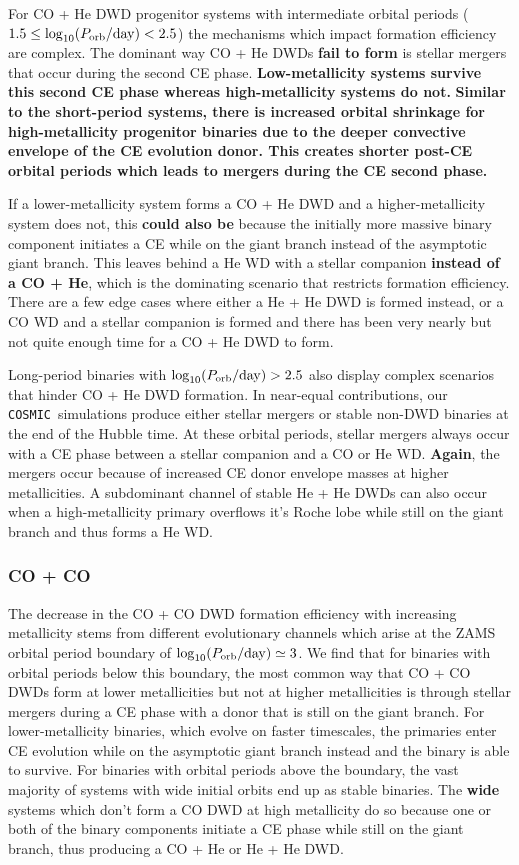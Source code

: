 \documentclass[twocolumn, linenumbers]{aastex631}
\newcommand{\cosmic}{\texttt{COSMIC}}
\begin{document}
For CO + He DWD progenitor systems with intermediate orbital periods 
($1.5\leq \log_{10}(P_{\rm{orb}}/\rm{day})< 2.5$) the mechanisms which 
impact formation efficiency are complex. The dominant way CO + He DWDs 
\textbf{fail to form} is stellar mergers that occur during the second CE 
phase. \textbf{Low-metallicity systems survive this second CE phase 
whereas high-metallicity systems do not.} \textbf{Similar to the 
short-period systems, there is increased orbital shrinkage for 
high-metallicity progenitor binaries due to the deeper convective envelope 
of the CE evolution donor. This creates shorter post-CE orbital periods 
which leads to mergers during the CE second phase.}

If a lower-metallicity system forms a CO + He DWD and a higher-metallicity 
system does not, this \textbf{could also be} because the initially more 
massive binary component initiates a CE while on the giant branch instead 
of the asymptotic giant branch. This leaves behind a He WD with a stellar 
companion \textbf{instead of a CO + He}, which is the dominating scenario 
that restricts formation efficiency. There are a few edge cases where 
either a He + He DWD is formed instead, or a CO WD and a stellar companion 
is formed and there has been very nearly but not quite enough time for a 
CO + He DWD to form. 

Long-period binaries with $\log_{10}(P_{\rm{orb}}/\rm{day})>2.5$ also 
display complex scenarios that hinder CO + He DWD formation. In near-equal 
contributions, our \cosmic\ simulations produce either stellar mergers or 
stable non-DWD binaries at the end of the Hubble time. At these orbital 
periods, stellar mergers always occur with a CE phase between a stellar 
companion and a CO or He WD. \textbf{Again}, the mergers occur because of 
increased CE donor envelope masses at higher metallicities. A subdominant 
channel of stable He + He DWDs can also occur when a high-metallicity 
primary overflows it's Roche lobe while still on the giant branch and thus 
forms a He WD.

\subsubsection{\textbf{CO + CO}}\label{formeff_COCO}
The decrease in the CO + CO DWD formation efficiency with increasing 
metallicity stems from different evolutionary channels which arise at the 
ZAMS orbital period boundary of $\log_{10}(P_{\rm{orb}}/\rm{day})\simeq3$. 
We find that for binaries with orbital periods below this boundary, the 
most common way that CO + CO DWDs form at lower metallicities but not at 
higher metallicities is through stellar mergers during a CE phase with a 
donor that is still on the giant branch. For lower-metallicity binaries, 
which evolve on faster timescales, the primaries enter CE evolution while 
on the asymptotic giant branch instead and the binary is able to survive. 
For binaries with orbital periods above the boundary, the vast majority of 
systems with wide initial orbits end up as stable binaries. The 
\textbf{wide} systems which don’t form a CO DWD at high metallicity do so 
because one or both of the binary components initiate a CE phase while 
still on the giant branch, thus producing a CO + He or He + He DWD. 
\end{document}
